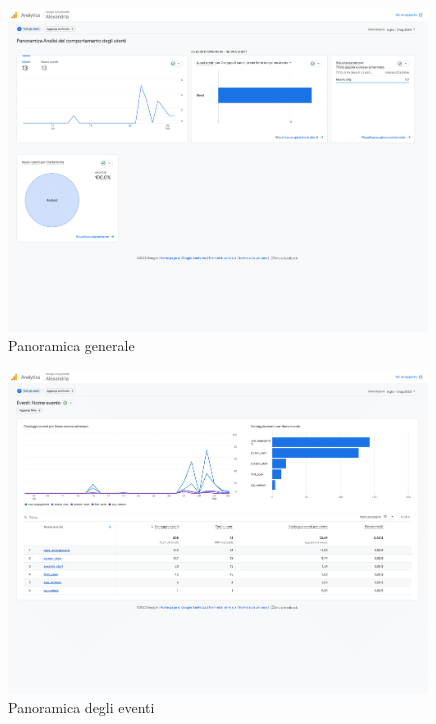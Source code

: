 \begin{figure}[H]
    \centering
    \includegraphics[width=0.99\textwidth]{Immagini/Alexandria/Report/panoramica-1.png}
    \caption{Panoramica generale}
    \label{fig:mesh}
\end{figure}

\begin{figure}[H]
    \centering
    \includegraphics[width=0.99\textwidth]{Immagini/Alexandria/Report/eventi-1.png}
    \caption{Panoramica degli eventi}
    \label{fig:mesh}
\end{figure}

